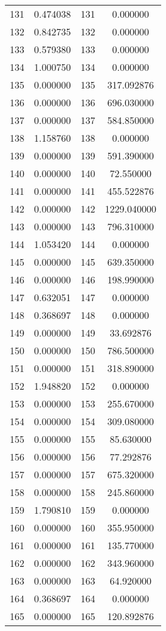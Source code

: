 \documentclass[12pt]{article}
\begin{document}
\begin{longtable}{@{}cccc@{}}
131 & 0.474038 & 131 & 0.000000 \\
132 & 0.842735 & 132 & 0.000000 \\
133 & 0.579380 & 133 & 0.000000 \\
134 & 1.000750 & 134 & 0.000000 \\
135 & 0.000000 & 135 & 317.092876 \\
136 & 0.000000 & 136 & 696.030000 \\
137 & 0.000000 & 137 & 584.850000 \\
138 & 1.158760 & 138 & 0.000000 \\
139 & 0.000000 & 139 & 591.390000 \\
140 & 0.000000 & 140 & 72.550000 \\
141 & 0.000000 & 141 & 455.522876 \\
142 & 0.000000 & 142 & 1229.040000 \\
143 & 0.000000 & 143 & 796.310000 \\
144 & 1.053420 & 144 & 0.000000 \\
145 & 0.000000 & 145 & 639.350000 \\
146 & 0.000000 & 146 & 198.990000 \\
147 & 0.632051 & 147 & 0.000000 \\
148 & 0.368697 & 148 & 0.000000 \\
149 & 0.000000 & 149 & 33.692876 \\
150 & 0.000000 & 150 & 786.500000 \\
151 & 0.000000 & 151 & 318.890000 \\
152 & 1.948820 & 152 & 0.000000 \\
153 & 0.000000 & 153 & 255.670000 \\
154 & 0.000000 & 154 & 309.080000 \\
155 & 0.000000 & 155 & 85.630000 \\
156 & 0.000000 & 156 & 77.292876 \\
157 & 0.000000 & 157 & 675.320000 \\
158 & 0.000000 & 158 & 245.860000 \\
159 & 1.790810 & 159 & 0.000000 \\
160 & 0.000000 & 160 & 355.950000 \\
161 & 0.000000 & 161 & 135.770000 \\
162 & 0.000000 & 162 & 343.960000 \\
163 & 0.000000 & 163 & 64.920000 \\
164 & 0.368697 & 164 & 0.000000 \\
165 & 0.000000 & 165 & 120.892876 \\

\end{longtable}
\end{document}
